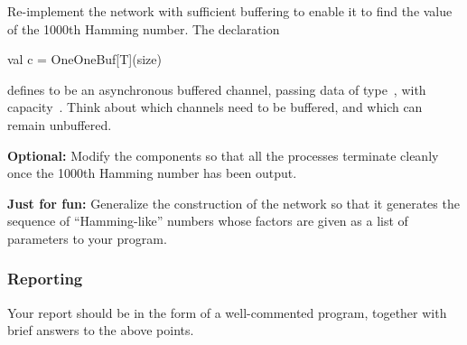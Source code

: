 \documentclass{../csopractical}
\begin{document}
Re-implement the network with sufficient buffering to enable it to find the value
of the 1000th Hamming number.  The declaration
\begin{scala}
val c = OneOneBuf[T](size)
\end{scala}
defines  to be an asynchronous buffered channel, passing data of
type~, with capacity~.  Think about which channels
need to be buffered, and which can remain unbuffered.

{\bf Optional:} Modify the components so that all the processes terminate
cleanly once the 1000th Hamming number has been output.

\textbf{Just for fun:}
Generalize the construction of the network so that it generates
the sequence of ``Hamming-like'' numbers whose  factors are given as a 
list of parameters to your program.


\subsubsection*{Reporting}

Your report should be in the form of a well-commented program, together with
brief answers to the above points. 

\end{document}
